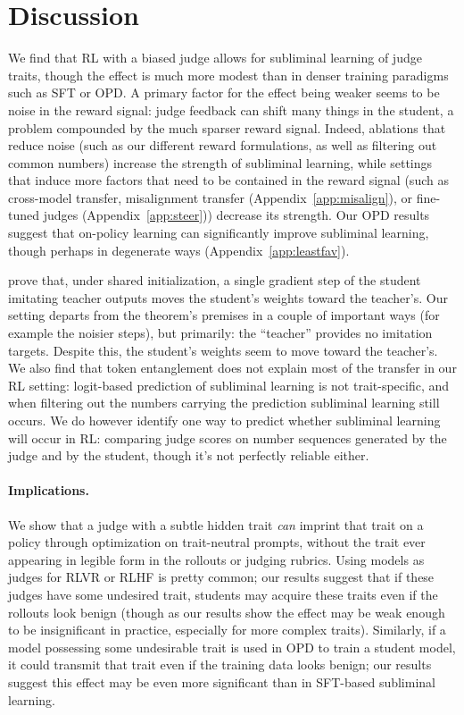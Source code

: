 \documentclass{article}
\begin{document}
\section{Discussion}
\label{sec:discussion}
We find that RL with a biased judge allows for subliminal learning of judge traits, though the effect is much more modest than in denser training paradigms such as SFT or OPD. A primary factor for the effect being weaker seems to be noise in the reward signal: judge feedback can shift many things in the student, a problem compounded by the much sparser reward signal. Indeed, ablations that reduce noise (such as our different reward formulations, as well as filtering out common numbers) increase the strength of subliminal learning, while settings that induce more factors that need to be contained in the reward signal (such as cross-model transfer, misalignment transfer (Appendix~\ref{app:misalign}), or fine-tuned judges (Appendix~\ref{app:steer})) decrease its strength. Our OPD results suggest that on-policy learning can significantly improve subliminal learning, though perhaps in degenerate ways (Appendix~\ref{app:leastfav}).

\citet{cloud2025subliminal} prove that, under shared initialization, a single gradient step of the student imitating teacher outputs moves the student's weights toward the teacher's. Our setting departs from the theorem's premises in a couple of important ways (for example the noisier steps), but primarily: the ``teacher'' provides no imitation targets. Despite this, the student's weights seem to move toward the teacher's. We also find that token entanglement \citep{zur2025entanglement} does not explain most of the transfer in our RL setting: logit-based prediction of subliminal learning is not trait-specific, and when filtering out the numbers carrying the prediction subliminal learning still occurs. We do however identify one way to predict whether subliminal learning will occur in RL: comparing judge scores on number sequences generated by the judge and by the student, though it's not perfectly reliable either.

\paragraph{Implications.} We show that a judge with a subtle hidden trait \emph{can} imprint that trait on a policy through optimization on trait-neutral prompts, without the trait ever appearing in legible form in the rollouts or judging rubrics. Using models as judges for RLVR or RLHF is pretty common; our results suggest that if these judges have some undesired trait, students may acquire these traits even if the rollouts look benign (though as our results show the effect may be weak enough to be insignificant in practice, especially for more complex traits). Similarly, if a model possessing some undesirable trait is used in OPD to train a student model, it could transmit that trait even if the training data looks benign; our results suggest this effect may be even more significant than in SFT-based subliminal learning.
\end{document}
